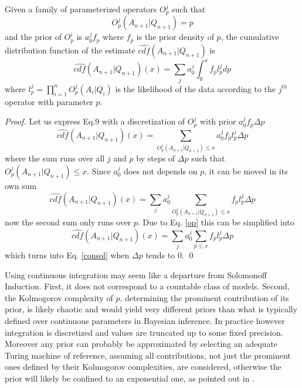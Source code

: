 \documentclass[runningheads]{llncs}
\begin{document}
\begin{theorem}
  Given a family of parameterized operators $O^j_p$ such that
  \begin{equation}
    \label{op}
    O^j_p(A_{n+1}|Q_{n+1})=p
  \end{equation}
  and the prior of $O^i_p$ is $a_0^jf_p$ where $f_p$ is the prior
  density of $p$, the cumulative distribution function of the estimate
  $\hat{cdf}(A_{n+1}|Q_{n+1})$ is
  \begin{equation}
    \label{consol}
    \hat{cdf}(A_{n+1}|Q_{n+1})(x) = \sum_j a_0^j \int_0^x f_p l_p^j dp
  \end{equation}
  where $l_p^j= \prod_{i=1}^{n} O^j_p(A_i|Q_i)$ is the likelihood of
  the data according to the $j^{th}$ operator with parameter $p$.
\end{theorem}
\begin{proof}
  Let us express Eq.9 with a discretization of $O^j_p$ with prior
  $a^j_0 f_p \Delta p$
\begin{equation}
  \hat{cdf}(A_{n+1}|Q_{n+1})(x) = \sum_{O^j_p(A_{n+1}|Q_{n+1})\le x}
  a_0^j f_p l_p^j \Delta p
\end{equation}
where the sum runs over all $j$ and $p$ by steps of $\Delta p$ such
that $O^j_p(A_{n+1}|Q_{n+1})\le x$. Since $a_0^j$ does not depends on
$p$, it can be moved in its own sum
\begin{equation}
  \hat{cdf}(A_{n+1}|Q_{n+1})(x) = \sum_j a_0^j
  \sum_{O^j_p(A_{n+1}|Q_{n+1})\le x} f_p l_p^j \Delta p
\end{equation}
now the second sum only runs over $p$. Due to Eq. \ref{op} this can be
simplified into
\begin{equation}
  \hat{cdf}(A_{n+1}|Q_{n+1})(x) = \sum_j a_0^j \sum_{p\le x} f_p l_p^j
  \Delta p
\end{equation}
which turns into Eq. \ref{consol} when $\Delta p$ tends to 0. \qed
\end{proof}
Using continuous integration may seem like a departure from Solomonoff
Induction. First, it does not correspond to a countable class of
models. Second, the Kolmogorov complexity of $p$, determining the
prominent contribution of its prior, is likely chaotic and would yield
very different priors than what is typically defined over continuous
parameters in Bayesian inference. In practice however integration is
discretized and values are truncated up to some fixed precision.
Moreover any prior can probably be approximated by selecting an
adequate Turing machine of reference, assuming all contributions, not
just the prominent ones defined by their Kolmogorov complexities, are
considered, otherwise the prior will likely be confined to an
exponential one, as pointed out in \cite{Goertzel10Toward}.
\end{document}
